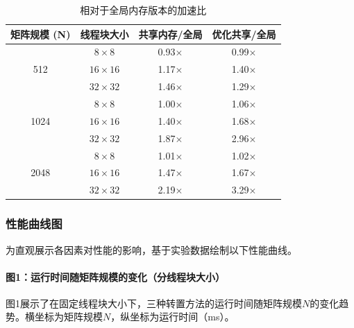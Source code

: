 \documentclass{SYSUReport}
\begin{document}
\begin{table}[h!]
\centering
\caption{相对于全局内存版本的加速比}
\begin{tabular}{|c|c|c|c|}
\hline
矩阵规模 (N) & 线程块大小 & 共享内存/全局 & 优化共享/全局 \\
\hline
\multirow{3}{*}{512} & $8\times8$ & 0.93$\times$ & 0.99$\times$ \\
\cline{2-4}
& $16\times16$ & 1.17$\times$ & 1.40$\times$ \\
\cline{2-4}
& $32\times32$ & 1.46$\times$ & 1.29$\times$ \\
\hline
\multirow{3}{*}{1024} & $8\times8$ & 1.00$\times$ & 1.06$\times$ \\
\cline{2-4}
& $16\times16$ & 1.40$\times$ & 1.68$\times$ \\
\cline{2-4}
& $32\times32$ & 1.87$\times$ & 2.96$\times$ \\
\hline
\multirow{3}{*}{2048} & $8\times8$ & 1.01$\times$ & 1.02$\times$ \\
\cline{2-4}
& $16\times16$ & 1.47$\times$ & 1.67$\times$ \\
\cline{2-4}
& $32\times32$ & 2.19$\times$ & 3.29$\times$ \\
\hline
\end{tabular}
\end{table}

\newpage

\subsubsection{性能曲线图}
为直观展示各因素对性能的影响，基于实验数据绘制以下性能曲线。

\paragraph{图1：运行时间随矩阵规模的变化（分线程块大小）}

图1展示了在固定线程块大小下，三种转置方法的运行时间随矩阵规模$N$的变化趋势。横坐标为矩阵规模$N$，纵坐标为运行时间（ms）。
\end{document}
